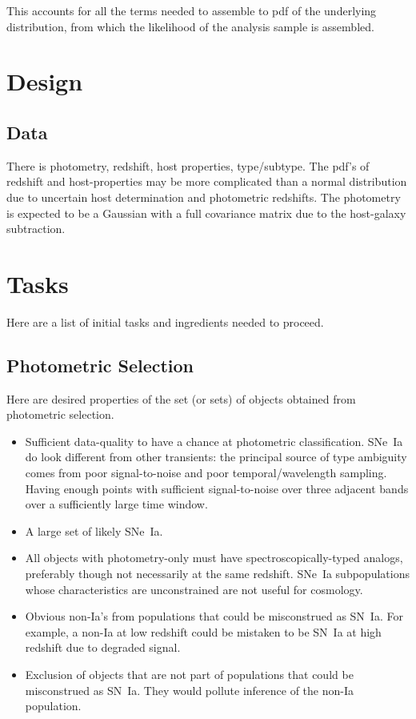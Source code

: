 \documentclass[preprint,3p]{elsarticle}
\begin{document}
This accounts for all the terms needed to assemble to pdf of the underlying distribution,
from which the likelihood of the analysis sample is assembled.

\section{Design}
\subsection{Data}
There is photometry, redshift, host properties, type/subtype.  The pdf's of redshift and
host-properties may be more complicated than a normal distribution due to uncertain host
determination and photometric redshifts.  The photometry is expected to be a Gaussian
with a full covariance matrix due to the host-galaxy subtraction.  

\section{Tasks}
Here are a list of initial tasks and ingredients needed to proceed.
\subsection{Photometric Selection}
Here are desired properties of the set (or sets) of objects obtained from photometric selection.
\begin{itemize}
\item Sufficient data-quality to have a chance at photometric classification.
SNe~Ia do look different from other transients: the principal source of type  ambiguity
comes from poor signal-to-noise and poor temporal/wavelength sampling.
Having enough points with sufficient signal-to-noise over three adjacent bands over a 
sufficiently large time window.
\item A large set of likely SNe~Ia.
\item All objects with photometry-only must have spectroscopically-typed analogs, preferably though not necessarily at the same redshift.  SNe~Ia subpopulations whose characteristics
are unconstrained are not useful for cosmology.
\item Obvious non-Ia's from populations that could be misconstrued as SN~Ia.  For example,
a non-Ia at low redshift could be
mistaken to be SN~Ia at high redshift due to degraded signal.  
\item Exclusion of objects that are not part of populations that could be misconstrued as SN~Ia.
They would pollute inference of the non-Ia population.
\end{itemize}
\end{document}
